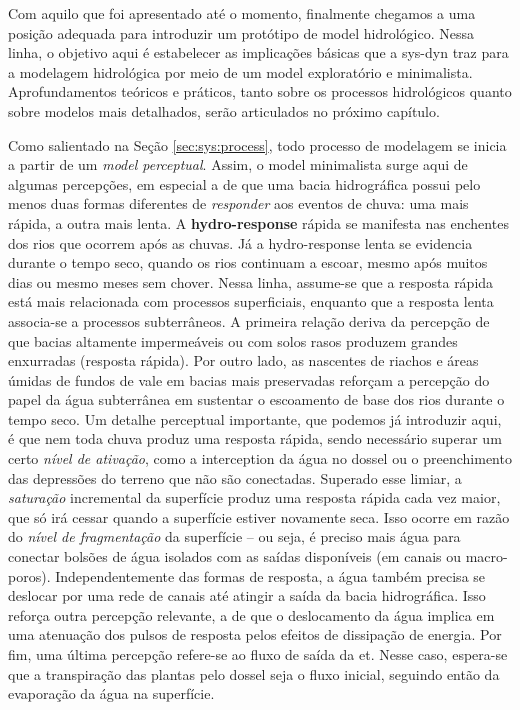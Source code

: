 \documentclass[./main.tex]{subfiles}
\begin{document}
\par Com aquilo que foi apresentado até o momento, finalmente chegamos a uma posição adequada para introduzir um protótipo de \gls{model} hidrológico. Nessa linha, o objetivo aqui é estabelecer as implicações básicas que a \gls{sys-dyn} traz para a modelagem hidrológica por meio de um \gls{model} exploratório e minimalista. Aprofundamentos teóricos e práticos, tanto sobre os processos hidrológicos quanto sobre modelos mais detalhados, serão articulados no próximo capítulo. 

\par Como salientado na Seção \ref{sec:sys:process}, todo processo de modelagem se inicia a partir de um \textit{\gls{model} perceptual}. Assim, o \gls{model} minimalista surge aqui de algumas percepções, em especial a de que uma bacia hidrográfica possui pelo menos duas formas diferentes de \textit{responder} aos eventos de chuva: uma mais rápida, a outra mais lenta. A \textbf{\gls{hydro-response}} rápida se manifesta nas enchentes dos rios que ocorrem após as chuvas. Já a \gls{hydro-response} lenta se evidencia durante o tempo seco, quando os rios continuam a escoar, mesmo após muitos dias ou mesmo meses sem chover. Nessa linha, assume-se que a resposta rápida está mais relacionada com processos superficiais, enquanto que a resposta lenta associa-se a processos subterrâneos. A primeira relação deriva da percepção de que bacias altamente impermeáveis ou com solos rasos produzem grandes enxurradas (resposta rápida). Por outro lado, as nascentes de riachos e áreas úmidas de fundos de vale em bacias mais preservadas reforçam a percepção do papel da água subterrânea em sustentar o escoamento de base dos rios durante o tempo seco. Um detalhe perceptual importante, que podemos já introduzir aqui, é que nem toda chuva produz uma resposta rápida, sendo necessário superar um certo \textit{nível de ativação}, como a \gls{interception} da água no dossel ou o preenchimento das depressões do terreno que não são conectadas. Superado esse limiar, a \textit{saturação} incremental da superfície produz uma resposta rápida cada vez maior, que só irá cessar quando a superfície estiver novamente seca. Isso ocorre em razão do \textit{nível de fragmentação} da superfície -- ou seja, é preciso mais água para conectar bolsões de água isolados com as saídas disponíveis (em canais ou macro-poros). Independentemente das formas de resposta, a água também precisa se deslocar por uma rede de canais até atingir a saída da bacia hidrográfica. Isso reforça outra percepção relevante, a de que o deslocamento da água implica em uma atenuação dos pulsos de resposta pelos efeitos de dissipação de energia. Por fim, uma última percepção refere-se ao fluxo de saída da \acrfull{et}. Nesse caso, espera-se que a transpiração das plantas pelo dossel seja o fluxo inicial, seguindo então da evaporação da água na superfície. 
\end{document}
